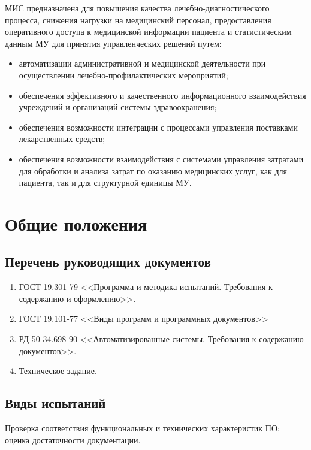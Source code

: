 МИС предназначена для повышения качества лечебно-диагностического процесса, снижения нагрузки на медицинский персонал, предоставления оперативного доступа к медицинской информации пациента и статистическим данным МУ для принятия управленческих решений путем:
\begin{itemize}
\item автоматизации административной и медицинской деятельности при осуществлении лечебно-профилактических мероприятий;
\item обеспечения эффективного и качественного информационного взаимодействия учреждений и организаций системы здравоохранения;
\item обеспечения возможности интеграции с процессами управления поставками лекарственных средств;
\item обеспечения возможности взаимодействия с системами управления затратами для обработки и анализа затрат по оказанию медицинских услуг, как для пациента, так и для структурной единицы МУ. 
\end{itemize}
 
\section{Общие положения}
\subsection{Перечень руководящих документов}
\begin{enumerate}
\item ГОСТ 19.301-79 <<Программа и методика испытаний. Требования к содержанию и оформлению>>.
\item ГОСТ 19.101-77 <<Виды программ и программных документов>>
\item  РД 50-34.698-90 <<Автоматизированные системы. Требования к содержанию документов>>.
\item Техническое задание.
\end{enumerate}

\subsection{Виды испытаний}
Проверка соответствия функциональных и технических характеристик ПО;
оценка достаточности документации.
 

